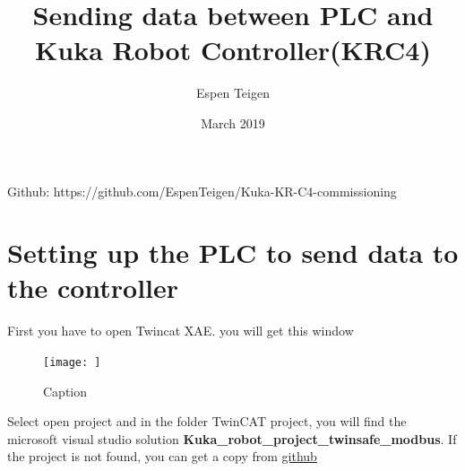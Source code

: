 \documentclass{article}
\title{Sending data between PLC and Kuka Robot Controller(KRC4)}
\author{Espen Teigen }
\date{March 2019}
\begin{document}
\maketitle

    Github: https://github.com/EspenTeigen/Kuka-KR-C4-commissioning

\newpage
\section{Setting up the PLC to send data to the controller}
First you have to open Twincat XAE. you will get this window

\begin{figure}
    \centering
    \texttt{[image: ]}
    \caption{Caption}
    \label{fig:my_label}
\end{figure}

Select open project and in the folder TwinCAT project, you will find the microsoft visual studio solution \textbf{Kuka\_robot\_project\_twinsafe\_modbus}. If the project is not found, you can get a copy from \href{https://github.com/EspenTeigen/Kuka-KR-C4-commissioning}{\underline{github}}
\end{document}
